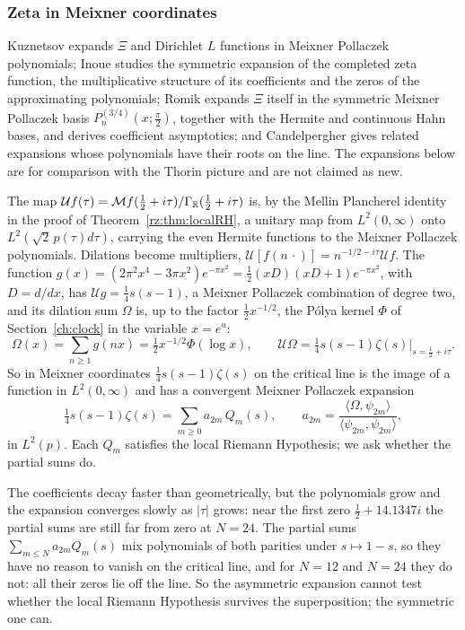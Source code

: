 \subsubsection{Zeta in Meixner coordinates}\label{rz:sec:mpexp}

Kuznetsov \cite{Kuz2007,Kuz2008} expands $\Xi$ and Dirichlet $L$ functions in Meixner Pollaczek polynomials; Inoue \cite{Inoue} studies the symmetric expansion of the completed zeta function, the multiplicative structure of its coefficients and the zeros of the approximating polynomials; Romik \cite{Romik} expands $\Xi$ itself in the symmetric Meixner Pollaczek basis $P_n^{(3/4)}(x;\frac\pi2)$, together with the Hermite and continuous Hahn bases, and derives coefficient asymptotics; and Candelpergher \cite{Candelpergher} gives related expansions whose polynomials have their roots on the line. The expansions below are for comparison with the Thorin picture and are not claimed as new.

The map $\mathcal U f(\tau)=\mathcal Mf(\frac12+i\tau)/\Gamma_{\mathbb{R}}(\frac12+i\tau)$ is, by the Mellin Plancherel identity in the proof of Theorem~\ref{rz:thm:localRH}, a unitary map from $L^2(0,\infty)$ onto $L^2(\sqrt2\,p(\tau)d\tau)$, carrying the even Hermite functions to the Meixner Pollaczek polynomials. Dilations become multipliers, $\mathcal U[f(n\,\cdot)]=n^{-1/2-i\tau}\mathcal Uf$. The function $g(x)=(2\pi^2x^4-3\pi x^2)e^{-\pi x^2}=\frac12(xD)(xD+1)e^{-\pi x^2}$, with $D=d/dx$, has $\mathcal Ug=\frac14s(s-1)$, a Meixner Pollaczek combination of degree two, and its dilation sum $\Omega$ is, up to the factor $\frac12x^{-1/2}$, the P\'olya kernel $\Phi$ of Section~\ref{ch:clock} in the variable $x=e^u$:
\[
\Omega(x)=\sum_{n\ge1}g(nx)=\tfrac12x^{-1/2}\Phi(\log x),\qquad \mathcal U\Omega=\tfrac14s(s-1)\zeta(s)\big|_{s=\frac12+i\tau}.
\]
So in Meixner coordinates $\frac14s(s-1)\zeta(s)$ on the critical line is the image of a function in $L^2(0,\infty)$ and has a convergent Meixner Pollaczek expansion
\[
\tfrac14s(s-1)\zeta(s)=\sum_{m\ge0}a_{2m}\,Q_m(s),\qquad a_{2m}=\frac{\langle\Omega,\psi_{2m}\rangle}{\langle\psi_{2m},\psi_{2m}\rangle},
\]
in $L^2(p)$. Each $Q_m$ satisfies the local Riemann Hypothesis; we ask whether the partial sums do.

The coefficients decay faster than geometrically, but the polynomials grow and the expansion converges slowly as $|\tau|$ grows: near the first zero $\frac12+14.1347i$ the partial sums are still far from zero at $N=24$. The partial sums $\sum_{m\le N}a_{2m}Q_m(s)$ mix polynomials of both parities under $s\mapsto1-s$, so they have no reason to vanish on the critical line, and for $N=12$ and $N=24$ they do not: all their zeros lie off the line. So the asymmetric expansion cannot test whether the local Riemann Hypothesis survives the superposition; the symmetric one can.

